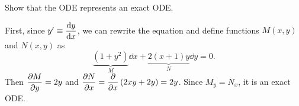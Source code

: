 Show that the ODE represents an exact ODE.

\nnl First, since $y' \equiv \displaystyle \dv{y}{x}$, we can rewrite the equation and define functions $M(x,y)$ and $N(x,y)$ as
$$\underbrace{(1+y^2)}_{M}\dd x + \underbrace{2(x+1)y }_{N}\dd y = 0.$$
Then $\displaystyle \pdv{M}{y} = 2y$ and $\displaystyle \pdv{N}{x} = \pdv{x} \pars{2xy+2y} = 2y$. Since $M_y = N_x$, it is an exact ODE.